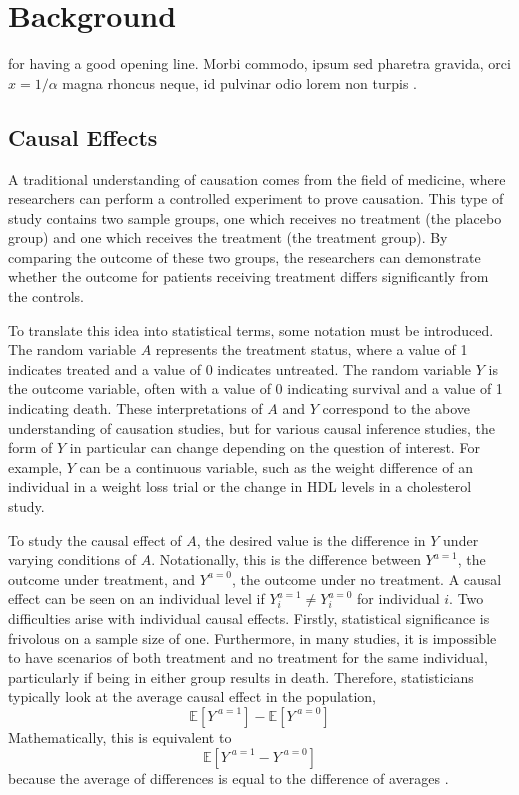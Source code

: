 
\chapter{Background}

 for having a good opening line. Morbi commodo, ipsum sed pharetra gravida, orci  $x = 1/\alpha$ magna rhoncus neque, id pulvinar odio lorem non turpis \cite{Eigen1971, Knuth1968}. 


\section{Causal Effects} 

A traditional understanding of causation comes from the field of medicine, where researchers can perform a controlled experiment to prove causation.  This type of study contains two sample groups, one which receives no treatment (the placebo group) and one which receives the treatment (the treatment group).  By comparing the outcome of these two groups, the researchers can demonstrate whether the outcome for patients receiving treatment differs significantly from the controls.  

To translate this idea into statistical terms, some notation must be introduced.  The random variable $A$ represents the treatment status, where a value of 1 indicates treated and a value of 0 indicates untreated.  The random variable $Y$ is the outcome variable, often with a value of 0 indicating survival and a value of 1 indicating death.  These interpretations of $A$ and $Y$ correspond to the above understanding of causation studies, but for various causal inference studies, the form of $Y$ in particular can change depending on the question of interest.  For example, $Y$ can be a continuous variable, such as the weight difference of an individual in a weight loss trial or the change in HDL levels in a cholesterol study.  

To study the causal effect of $A$, the desired value is the difference in $Y$ under varying conditions of $A$.  Notationally, this is the difference between $Y^{a=1}$, the outcome under treatment, and $Y^{a=0}$, the outcome under no treatment.  A causal effect can be seen on an individual level if $Y_i^{a=1} \neq Y_i^{a=0}$ for individual $i$.  Two difficulties arise with individual causal effects.  Firstly, statistical significance is frivolous on a sample size of one.  Furthermore, in many studies, it is impossible to have scenarios of both treatment and no treatment for the same individual, particularly if being in either group results in death.  Therefore, statisticians typically look at the average causal effect in the population, 
$$ \mathbb{E}[Y^{\; a=1}] - \mathbb{E}[Y^{\; a=0}]$$ 
Mathematically, this is equivalent to 
$$ \mathbb{E}[Y^{\; a=1} - Y^{\; a=0}]$$ 
because the average of differences is equal to the difference of averages \cite{}.  

